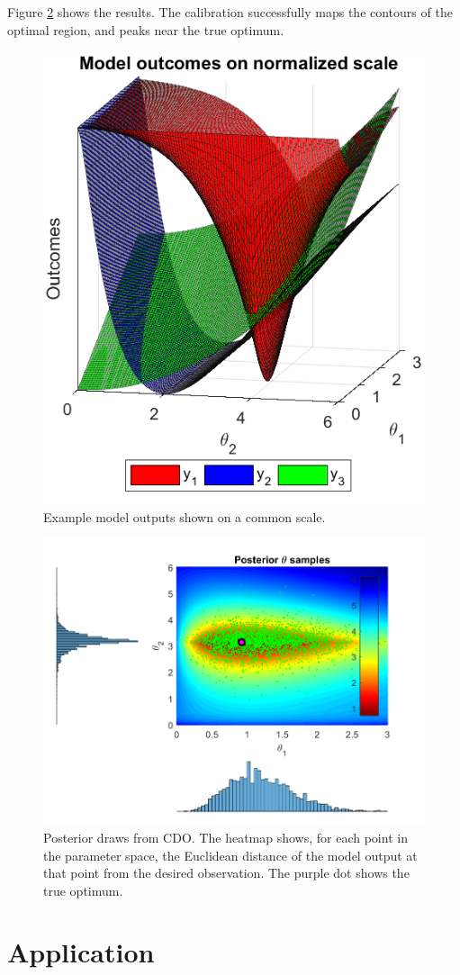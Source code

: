 \documentclass{article}
\begin{document}
Figure \ref{fig:toy_sim_results} shows the results. The calibration successfully maps the contours of the optimal region, and peaks near the true optimum. 



\begin{figure}
\centering
\includegraphics[width=.4\linewidth]{FIG_toy_sim_model_outputs}
\captionsetup{width=.4\linewidth}
\caption{Example model outputs shown on a common scale.}
\label{fig:toy_sim_outputs}
\end{figure}


\begin{figure}
\centering
\includegraphics[width=.75\linewidth]{FIG_toy_sim_model_results}
\captionsetup{width=.75\linewidth}
\caption{Posterior draws from CDO. The heatmap shows, for each point in the parameter space, the Euclidean distance of the model output at that point from the desired observation. The purple dot shows the true optimum.}
\label{fig:toy_sim_results}
\end{figure}



\section{Application}\label{application}
\end{document}
